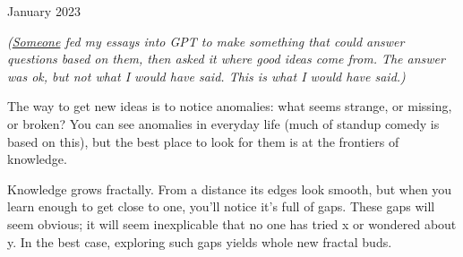 January 2023

\emph{(\href{https://twitter.com/stef/status/1617222428727586816}{Someone}
fed my essays into GPT to make something that could answer questions
based on them, then asked it where good ideas come from. The answer was
ok, but not what I would have said. This is what I would have said.)}

The way to get new ideas is to notice anomalies: what seems strange, or
missing, or broken? You can see anomalies in everyday life (much of
standup comedy is based on this), but the best place to look for them is
at the frontiers of knowledge.

Knowledge grows fractally. From a distance its edges look smooth, but
when you learn enough to get close to one, you'll notice it's full of
gaps. These gaps will seem obvious; it will seem inexplicable that no
one has tried x or wondered about y. In the best case, exploring such
gaps yields whole new fractal buds.
